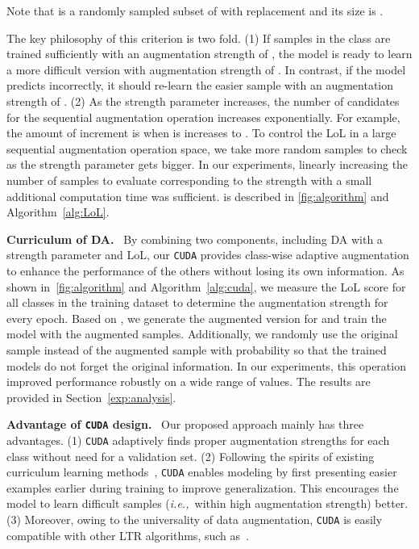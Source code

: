 \documentclass{article}
\newcommand{\ie}{\emph{i.e.,~}}
\newcommand{\myparagraph}[1]{\vspace{0.07cm}\noindent\textbf{#1}~}
\def\code#1{\texttt{#1}}
\newcommand{\alg}{\code{CUDA}\xspace}
\renewcommand*\cite[1]{\citep{#1}}
\begin{document}
Note that  is a randomly sampled subset of  with replacement and its size is .





The key philosophy of this criterion is two fold. (1) If samples in the class  are trained sufficiently with an augmentation strength of , the model is ready to learn a more difficult version with augmentation strength of . In contrast, if the model predicts incorrectly, it should re-learn the easier sample with an augmentation strength of . (2) As the strength parameter increases, the number of candidates for the sequential augmentation operation  increases exponentially. For example, the amount of increment is  when  is increases to . To control the LoL in a large sequential augmentation operation space, we take more random samples to check as the strength parameter gets bigger. In our experiments, linearly increasing the number of samples to evaluate corresponding to the strength with a small additional computation time was sufficient.  is described in  \autoref{fig:algorithm} and Algorithm~\ref{alg:LoL}.





\myparagraph{Curriculum of DA.} By combining two components, including DA with a strength parameter and LoL, our \alg provides class-wise adaptive augmentation to enhance the performance of the others without losing its own information. As shown in~\autoref{fig:algorithm} and Algorithm~\ref{alg:cuda}, we measure the LoL score  for all classes in the training dataset to determine the augmentation strength for every epoch. Based on , we generate the augmented version  for  and train the model with the augmented samples. Additionally, we randomly use the original sample instead of the augmented sample with probability  so that the trained models do not forget the original information. In our experiments, this operation improved performance robustly on a wide range of  values. The results are provided in Section~\ref{exp:analysis}.

\myparagraph{Advantage of \alg design.}
Our proposed approach mainly has three advantages. (1) \alg adaptively finds proper augmentation strengths for each class without need for a validation set. 
(2) Following the spirits of existing curriculum learning methods~\cite{hacohen2019power, zhou2020curriculum, wu2021when}, \alg enables modeling by first presenting easier examples earlier during training to improve generalization. This encourages the model to learn difficult samples (\ie within high augmentation strength) better. (3) Moreover, owing to the universality of data augmentation, \alg is easily compatible with other LTR algorithms, such as~\cite{cao2019learning, ren2020balanced, wang2021longtailed}.
\end{document}

